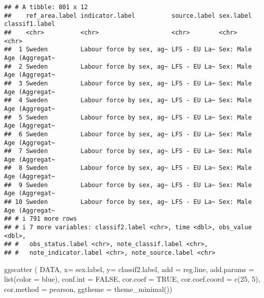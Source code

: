 \documentclass[
  12pt,
]{article}
\newenvironment{Shaded}{\begin{snugshade}}{\end{snugshade}}
\newcommand{\AttributeTok}[1]{\textcolor[rgb]{0.77,0.63,0.00}{#1}}
\newcommand{\ConstantTok}[1]{\textcolor[rgb]{0.00,0.00,0.00}{#1}}
\newcommand{\DecValTok}[1]{\textcolor[rgb]{0.00,0.00,0.81}{#1}}
\newcommand{\FunctionTok}[1]{\textcolor[rgb]{0.00,0.00,0.00}{#1}}
\newcommand{\NormalTok}[1]{#1}
\newcommand{\StringTok}[1]{\textcolor[rgb]{0.31,0.60,0.02}{#1}}
\begin{document}
\begin{verbatim}
## # A tibble: 801 x 12
##    ref_area.label indicator.label          source.label sex.label classif1.label
##    <chr>          <chr>                    <chr>        <chr>     <chr>         
##  1 Sweden         Labour force by sex, ag~ LFS - EU La~ Sex: Male Age (Aggregat~
##  2 Sweden         Labour force by sex, ag~ LFS - EU La~ Sex: Male Age (Aggregat~
##  3 Sweden         Labour force by sex, ag~ LFS - EU La~ Sex: Male Age (Aggregat~
##  4 Sweden         Labour force by sex, ag~ LFS - EU La~ Sex: Male Age (Aggregat~
##  5 Sweden         Labour force by sex, ag~ LFS - EU La~ Sex: Male Age (Aggregat~
##  6 Sweden         Labour force by sex, ag~ LFS - EU La~ Sex: Male Age (Aggregat~
##  7 Sweden         Labour force by sex, ag~ LFS - EU La~ Sex: Male Age (Aggregat~
##  8 Sweden         Labour force by sex, ag~ LFS - EU La~ Sex: Male Age (Aggregat~
##  9 Sweden         Labour force by sex, ag~ LFS - EU La~ Sex: Male Age (Aggregat~
## 10 Sweden         Labour force by sex, ag~ LFS - EU La~ Sex: Male Age (Aggregat~
## # i 791 more rows
## # i 7 more variables: classif2.label <chr>, time <dbl>, obs_value <dbl>,
## #   obs_status.label <chr>, note_classif.label <chr>,
## #   note_indicator.label <chr>, note_source.label <chr>
\end{verbatim}

\begin{Shaded}
\begin{Highlighting}[]
  \FunctionTok{ggscatter}\NormalTok{ ( DATA,}
             \AttributeTok{x=} \StringTok{\textquotesingle{}sex.label\textquotesingle{}}\NormalTok{,}
             \AttributeTok{y=} \StringTok{\textquotesingle{}classif2.label\textquotesingle{}}\NormalTok{,}
             \AttributeTok{add =} \StringTok{\textquotesingle{}reg.line\textquotesingle{}}\NormalTok{,}
             \AttributeTok{add.params =} \FunctionTok{list}\NormalTok{(}\AttributeTok{color =} \StringTok{\textquotesingle{}blue\textquotesingle{}}\NormalTok{),}
             \AttributeTok{conf.int =} \ConstantTok{FALSE}\NormalTok{,}
             \AttributeTok{cor.coef =} \ConstantTok{TRUE}\NormalTok{,}
             \AttributeTok{cor.coef.coord =} \FunctionTok{c}\NormalTok{(}\DecValTok{25}\NormalTok{, }\DecValTok{5}\NormalTok{),}
             \AttributeTok{cor.method =} \StringTok{\textquotesingle{}pearson\textquotesingle{}}\NormalTok{,}
             \AttributeTok{ggtheme =} \FunctionTok{theme\_minimal}\NormalTok{())}
\end{Highlighting}
\end{Shaded}
\end{document}
